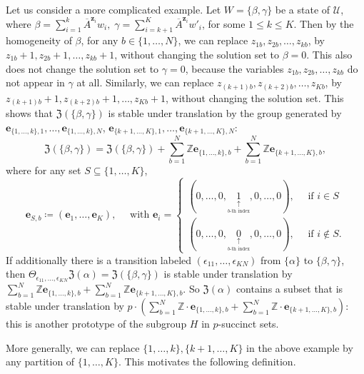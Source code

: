 \documentclass[letterpaper, 11pt, thm-restate]{article}
\numberwithin{equation}{section}
\newcommand{\Z}{\mathbb{Z}}
\newcommand{\mZ}{\mathfrak{Z}}
\newcommand{\be}{\boldsymbol{e}}
\newcommand{\mmU}{\mathscr{U}}
\newcommand{\bz}{\boldsymbol{z}}
\newcommand{\oA}{\overline{A}}
\theoremstyle{definition}
\theoremstyle{definition}
\theoremstyle{definition}
\begin{document}
Let us consider a more complicated example.
Let $W = \{\beta, \gamma\}$ be a state of $\mmU$, where $\beta = \sum_{i = 1}^{k} \oA^{\bz_i} w_i,\; \gamma = \sum_{i = k+1}^{K} \oA^{\bz_i} w'_i$, for some $1 \leq k \leq K$.
Then by the homogeneity of $\beta$, for any $b \in \{1, \ldots, N\}$, we can replace $z_{1b}, z_{2b}, \ldots, z_{kb}$, by $z_{1b}+1, z_{2b}+1, \ldots, z_{kb}+1$, without changing the solution set to $\beta = 0$.
This also does not change the solution set to $\gamma = 0$, because the variables $z_{1b}, z_{2b}, \ldots, z_{kb}$ do not appear in $\gamma$ at all.
Similarly, we can replace $z_{(k+1)b}, z_{(k+2)b}, \ldots, z_{Kb}$, by $z_{(k+1)b} + 1, z_{(k+2)b} + 1, \ldots, z_{Kb} + 1$, without changing the solution set.
This shows that $\mZ(\{\beta, \gamma\})$ is stable under translation by the group generated by $\be_{\{1, \ldots, k\}, 1}, \ldots, \be_{\{1, \ldots, k\}, N}$, $\be_{\{k+1, \ldots, K\}, 1}, \ldots, \be_{\{k+1, \ldots, K\}, N}$:
\[
\mZ(\{\beta, \gamma\}) = \mZ(\{\beta, \gamma\}) + \sum_{b = 1}^N \Z \be_{\{1, \ldots, k\}, b} + \sum_{b = 1}^N \Z \be_{\{k+1, \ldots, K\}, b},
\]
where for any set $S \subseteq \{1, \ldots, K\}$,
\begin{equation*}
\be_{S, b} \coloneqq (\be_1, \ldots, \be_K), \quad \text{ with } 
\be_i =
\begin{cases}
    (0, \ldots, 0, \underset{\underset{\text{$b$-th index}}{\uparrow}}{1}, 0, \ldots, 0), \quad \text{ if } i \in S \\
    (0, \ldots, 0, \underset{\underset{\text{$b$-th index}}{\uparrow}}{0}, 0, \ldots, 0) , \quad  \text{ if } i \notin S.
\end{cases}
\end{equation*}
If additionally there is a transition labeled $(\epsilon_{11}, \ldots, \epsilon_{KN})$ from $\{\alpha\}$ to $\{\beta, \gamma\}$, then $\Theta_{\epsilon_{11}, \ldots, \epsilon_{KN}}\mZ(\alpha) = \mZ(\{\beta, \gamma\})$ is stable under translation by $\sum_{b = 1}^N \Z \be_{\{1, \ldots, k\}, b} + \sum_{b = 1}^N \Z \be_{\{k+1, \ldots, K\}, b}$.
So $\mZ(\alpha)$ contains a subset that is stable under translation by $p \cdot \left(\sum_{b = 1}^N \Z \cdot \be_{\{1, \ldots, k\}, b} + \sum_{b = 1}^N \Z \cdot \be_{\{k+1, \ldots, K\}, b} \right)$: this is another prototype of the subgroup $H$ in $p$-succinct sets.

More generally, we can replace $\{1, \ldots, k\}, \{k+1, \ldots, K\}$ in the above example by any partition of $\{1, \ldots, K\}$.
This motivates the following definition.
\end{document}
